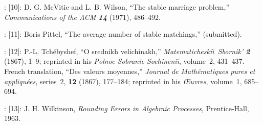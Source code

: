 \smallskip
\disleft 25pt:
[10]:
D. G. McVitie and L. B. Wilson, ``The stable marriage problem,''
{\sl Communications of the ACM\/ \bf 14} (1971), 486--492.

\smallskip
\disleft 25pt:
[11]:
Boris Pittel, ``The average number of stable matchings,'' (submitted).

\smallskip
\disleft 25pt:
[12]:
P.-L. Tch\'ebyshef, 
``O srednikh velichinakh,'' {\sl Matematicheski\u\i\ Sbornik'\/ \bf 2}
(1867), 1--9; reprinted in his {\sl Polnoe Sobranie Sochineni\u\i},
volume~2, 431--437. French translation,
``Des valeurs moyennes,''
{\sl Journal de Math\'ema\-tiques pures et appliqu\'ees}, series~2, {\bf12}
(1867), 177--184; reprinted in his {\sl \OE uvres}, volume~1, 685--694.

\smallskip
\disleft 25pt:
[13]:
J. H. Wilkinson, {\sl Rounding Errors in Algebraic Processes}, Prentice-Hall,
1963.

\bye
